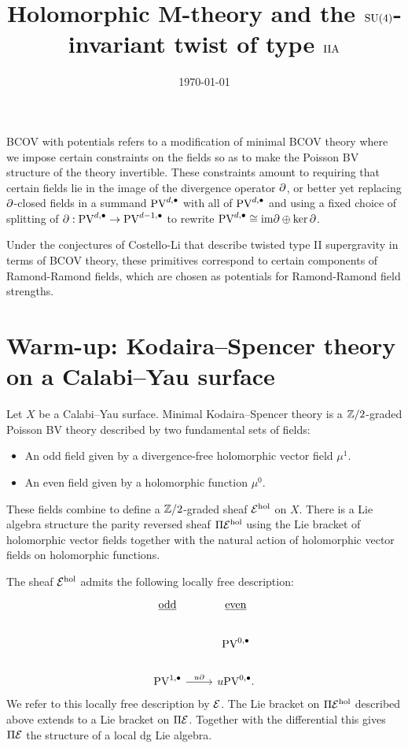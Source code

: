 \documentclass[11pt]{article}
\date{\today}
\title{Holomorphic M-theory and the $\text{SU}(4)$-invariant twist of type $\text{IIA}$ }
\newcommand\bu{\bullet}
\begin{document}
\maketitle

BCOV with potentials refers to a modification of minimal BCOV theory where we impose certain constraints on the fields so as to make the Poisson BV structure of the theory invertible. These constraints amount to requiring that certain fields lie in the image of the divergence operator \(\partial\), or better yet replacing $\partial$-closed fields in a summand \(\text{PV}^{d,\bullet}\) with all of \(\text{PV}^{d,\bullet}\) and using a fixed choice of splitting of \(\partial: \text{PV}^{d,\bullet}\to \text{PV}^{d-1,\bullet}\) to rewrite \(\text{PV}^{d,\bullet}\cong\text{im}\partial\oplus\ker\partial\).

Under the conjectures of Costello-Li that describe twisted type II supergravity in terms of BCOV theory, these primitives correspond to certain components of Ramond-Ramond fields, which are chosen as potentials for Ramond-Ramond field strengths.

\section{Warm-up: Kodaira--Spencer theory on a Calabi--Yau surface}

Let $X$ be a Calabi--Yau surface. 
Minimal Kodaira--Spencer theory is a $\mathbb{Z}/2$-graded Poisson BV theory described by two fundamental sets of fields:
\begin{itemize}
\item An odd field given by a divergence-free holomorphic vector field $\mu^1$. 
\item An even field given by a holomorphic function $\mu^0$.
\end{itemize}
These fields combine to define a $\mathbb{Z}/2$-graded sheaf $\mathcal{E}^{\rm hol}$ on $X$. 
There is a Lie algebra structure the parity reversed sheaf $\Pi \mathcal{E}^{\rm hol}$ using the Lie bracket of holomorphic vector fields together with the natural action of holomorphic vector fields on holomorphic functions. 

The sheaf $\mathcal{E}^{\rm hol}$ admits the following locally free description:
\[
\begin{tikzcd}
\ul{\rm odd} & \ul{\rm even} \\
 & \PV^{0,\bu} \\
 \PV^{1,\bu} \ar[r, "u \partial"] & u \PV^{0,\bu} .
\end{tikzcd}
\]
We refer to this locally free description by $\mathcal{E}$. 
The Lie bracket on $\Pi \mathcal{E}^{\rm hol}$ described above extends to a Lie bracket on $\Pi \mathcal{E}$.
Together with the differential this gives $\Pi \mathcal{E}$ the structure of a local dg Lie algebra. 
\end{document}
